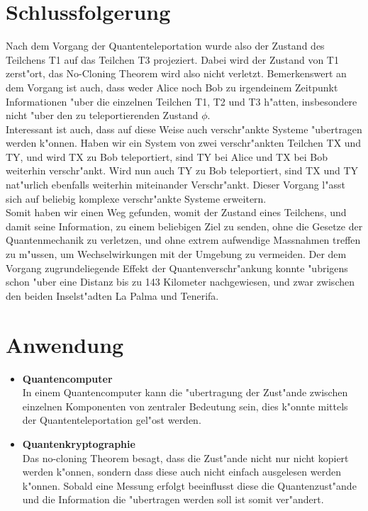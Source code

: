 \begin{refsection}
\section{Schlussfolgerung}
Nach dem Vorgang der Quantenteleportation wurde also der Zustand des Teilchens T1 auf das Teilchen T3 projeziert. Dabei wird der Zustand von T1 zerst"ort, das No-Cloning Theorem wird also nicht verletzt. Bemerkenswert an dem Vorgang ist auch, dass weder Alice noch Bob zu irgendeinem Zeitpunkt Informationen "uber die einzelnen Teilchen T1, T2 und T3 h"atten, insbesondere nicht "uber den zu teleportierenden Zustand $\phi$. 
\\
Interessant ist auch, dass auf diese Weise auch verschr"ankte Systeme "ubertragen werden k"onnen. Haben wir ein System von zwei verschr"ankten Teilchen TX und TY, und wird TX zu Bob teleportiert, sind TY bei Alice und TX bei Bob weiterhin verschr"ankt. Wird nun auch TY zu Bob teleportiert, sind TX und TY nat"urlich ebenfalls weiterhin miteinander Verschr"ankt. Dieser Vorgang l"asst sich auf beliebig komplexe verschr"ankte Systeme erweitern. 
\\
Somit haben wir einen Weg gefunden, womit der Zustand eines Teilchens, und damit seine Information, zu einem beliebigen Ziel zu senden, ohne die Gesetze der Quantenmechanik zu verletzen, und ohne extrem aufwendige Massnahmen treffen zu m"ussen, um Wechselwirkungen mit der Umgebung zu vermeiden. Der dem Vorgang zugrundeliegende Effekt der Quantenverschr"ankung konnte "ubrigens schon "uber eine Distanz bis zu 143 Kilometer nachgewiesen, und zwar zwischen den beiden Inselst"adten La Palma und Tenerifa.
\section{Anwendung}
	\begin{itemize}
		\item{\textbf{Quantencomputer} \\
			In einem Quantencomputer kann die "ubertragung der Zust"ande zwischen einzelnen Komponenten von zentraler Bedeutung sein, dies k"onnte mittels der Quantenteleportation gel"ost werden.
		}
		\item{\textbf{Quantenkryptographie} \\
			Das no-cloning Theorem besagt, dass die Zust"ande  nicht nur nicht kopiert werden k"onnen, sondern dass diese auch nicht einfach ausgelesen werden k"onnen. Sobald eine Messung erfolgt beeinflusst diese die Quantenzust"ande und die Information die "ubertragen werden soll ist somit ver"andert.
		}		
	\end{itemize}
\printbibliography[heading=subbibliography]
\end{refsection}